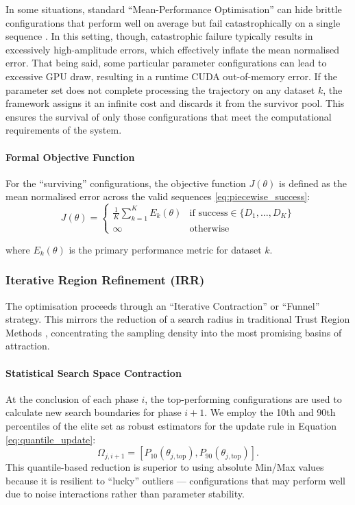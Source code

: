 In some situations, standard ``Mean-Performance Optimisation'' can hide brittle configurations that perform well on average but fail catastrophically on a single sequence \cite{kandasamyTuningHyperparametersGrad}. In this setting, though, catastrophic failure typically results in excessively high-amplitude errors, which effectively inflate the mean normalised error. That being said, some particular parameter configurations can lead to excessive GPU draw, resulting in a runtime CUDA out-of-memory error. If the parameter set does not complete processing the trajectory on any dataset $k$, the framework assigns it an infinite cost and discards it from the survivor pool. This ensures the survival of only those configurations that meet the computational requirements of the system.

\paragraph{Formal Objective Function}
For the ``surviving'' configurations, the objective function $J(\theta)$ is defined as the mean normalised error across the valid sequences \eqref{eq:piecewise_success}:
\begin{equation}
\label{eq:piecewise_success}
J(\theta) = 
\begin{cases} 
\frac{1}{K} \sum_{k=1}^K E_k(\theta) & \text{if success} \in \{D_1, \dots, D_K\} \\ 
\infty & \text{otherwise} 
\end{cases}
\end{equation}

where $E_k(\theta)$ is the primary performance metric for dataset $k$.

\subsubsection{Iterative Region Refinement (IRR)}
The optimisation proceeds through an ``Iterative Contraction'' or ``Funnel'' strategy. This mirrors the reduction of a search radius in traditional Trust Region Methods \cite{nocedalTrustRegionMethods2006}, concentrating the sampling density into the most promising basins of attraction.

\paragraph{Statistical Search Space Contraction}
At the conclusion of each phase $i$, the top-performing configurations are used to calculate new search boundaries for phase $i+1$. We employ the 10th and 90th percentiles of the elite set as robust estimators for the update rule in Equation \eqref{eq:quantile_update}:
\begin{equation}
\label{eq:quantile_update}
\Omega_{j, i+1} = [P_{10}(\theta_{j, \text{top}}), P_{90}(\theta_{j, \text{top}})].
\end{equation}
This quantile-based reduction is superior to using absolute Min/Max values because it is resilient to ``lucky'' outliers --- configurations that may perform well due to noise interactions rather than parameter stability.

